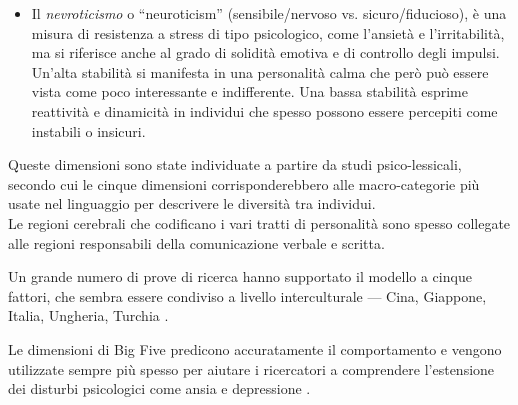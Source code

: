 \begin{itemize}
	\item Il \emph{nevroticismo} o ``neuroticism'' (sensibile/nervoso vs. sicuro/fiducioso), è una misura di resistenza a stress di tipo psicologico, come l'ansietà e l'irritabilità, ma si riferisce anche al grado di solidità emotiva e di controllo degli impulsi.\\
	Un'alta stabilità si manifesta in una personalità calma che però può essere vista come poco interessante e indifferente. Una bassa stabilità esprime reattività e dinamicità in individui che spesso possono essere percepiti come instabili o insicuri. 
\end{itemize}
Queste dimensioni sono state individuate a partire da studi psico-lessicali, secondo cui le cinque dimensioni corrisponderebbero alle macro-categorie più usate nel linguaggio per descrivere le diversità tra individui.\\
Le regioni cerebrali che codificano i vari tratti di personalità sono spesso collegate alle regioni responsabili della comunicazione verbale e scritta. 

Un grande numero di prove di ricerca hanno supportato il modello a cinque fattori, che sembra essere condiviso a livello interculturale --- Cina, Giappone, Italia, Ungheria, Turchia \cite{triandis2002cultural}.

Le dimensioni di Big Five predicono accuratamente il comportamento e vengono utilizzate sempre più spesso per aiutare i ricercatori a comprendere l'estensione dei disturbi psicologici come ansia e depressione \cite{saulsman2004five}.

